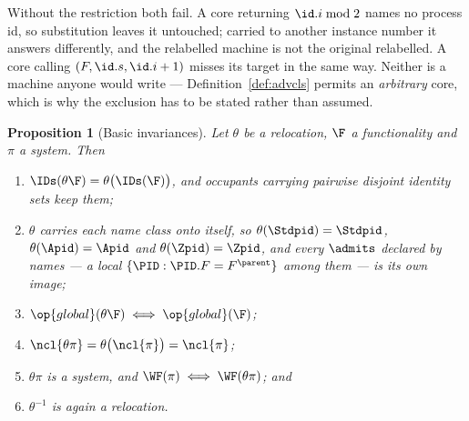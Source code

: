 \documentclass[10pt,oneside,openany]{book}
\theoremstyle{accentdef}
\theoremstyle{accentplain}
\newtheorem{proposition}[definition]{Proposition}
\begin{document}
Without the restriction both fail. A core returning $\id.i \bmod 2$ names no process id, so
substitution leaves it untouched; carried to another instance number it answers differently, and the
relabelled machine is not the original relabelled. A core calling
$(F,\id.s,\id.i + 1)$ misses its target in the same way. Neither is a machine anyone would write ---
Definition~\ref{def:advcls} permits an \emph{arbitrary} core, which is why the exclusion has to be
stated rather than assumed.

\begin{proposition}[Basic invariances]\label{prop:relocbasic}
Let $\theta$ be a relocation, $\F$ a functionality and $\pi$ a system. Then
\begin{enumerate}[label=(\roman*),leftmargin=2.2em]
  \item $\IDs(\theta\F) = \theta\bigl(\IDs(\F)\bigr)$, and occupants carrying pairwise disjoint
        identity sets keep them;
  \item $\theta$ carries each name class onto itself, so $\theta(\Stdpid) = \Stdpid$,
        $\theta(\Apid) = \Apid$ and $\theta(\Zpid) = \Zpid$, and every $\admits$ declared by names
        --- a local $\{\PID : \PID.F = F^{\parent}\}$ among them --- is its own image;
  \item $\op{global}(\theta\F) \iff \op{global}(\F)$;
  \item $\ncl{\theta\pi} = \theta\bigl(\ncl{\pi}\bigr) = \ncl{\pi}$;
  \item $\theta\pi$ is a system, and $\WF(\pi) \iff \WF(\theta\pi)$; and
  \item $\theta^{-1}$ is again a relocation.
\end{enumerate}
\end{proposition}
\end{document}
